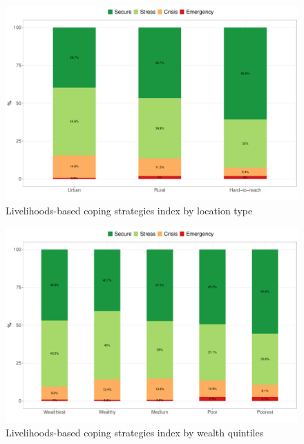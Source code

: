 \documentclass[12pt,a4paper]{article}
\begin{document}
\newpage

\begin{figure}[H]

{\centering \includegraphics{kayinReport_files/figure-latex/lcsi1plot-1} 

}

\caption{Livelihoods-based coping strategies index by location type}\label{fig:lcsi1plot}
\end{figure}

\begin{figure}[H]

{\centering \includegraphics{kayinReport_files/figure-latex/lcsi2plot-1} 

}

\caption{Livelihoods-based coping strategies index by wealth quintiles}\label{fig:lcsi2plot}
\end{figure}
\end{document}
